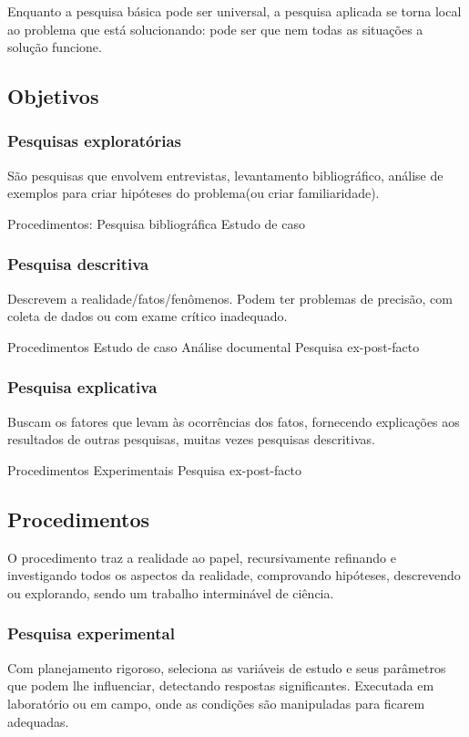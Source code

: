Enquanto a pesquisa básica pode ser universal, a pesquisa aplicada se torna local ao problema que está solucionando: pode ser que nem todas as situações a solução funcione.


\subsection{Objetivos}
\subsubsection{Pesquisas exploratórias}
São pesquisas que envolvem entrevistas, levantamento bibliográfico, análise de exemplos para criar hipóteses do problema(ou criar familiaridade).

Procedimentos:
Pesquisa bibliográfica
Estudo de caso

\subsubsection{Pesquisa descritiva}
Descrevem a realidade/fatos/fenômenos. Podem ter problemas de precisão, com coleta de dados ou com exame crítico inadequado.

Procedimentos
Estudo de caso
Análise documental
Pesquisa ex-post-facto

\subsubsection{Pesquisa explicativa}
Buscam os fatores que levam às ocorrências dos fatos, fornecendo explicações aos resultados de outras pesquisas, muitas vezes pesquisas descritivas.

Procedimentos
Experimentais
Pesquisa ex-post-facto


\subsection{Procedimentos}
O procedimento traz a realidade ao papel, recursivamente refinando e investigando todos os aspectos da realidade, comprovando hipóteses, descrevendo ou explorando, sendo um trabalho interminável de ciência.

\subsubsection{Pesquisa experimental}
Com planejamento rigoroso, seleciona as variáveis de estudo e seus parâmetros que podem lhe influenciar, detectando respostas significantes. Executada em laboratório ou em campo, onde as condições são manipuladas para ficarem adequadas.

